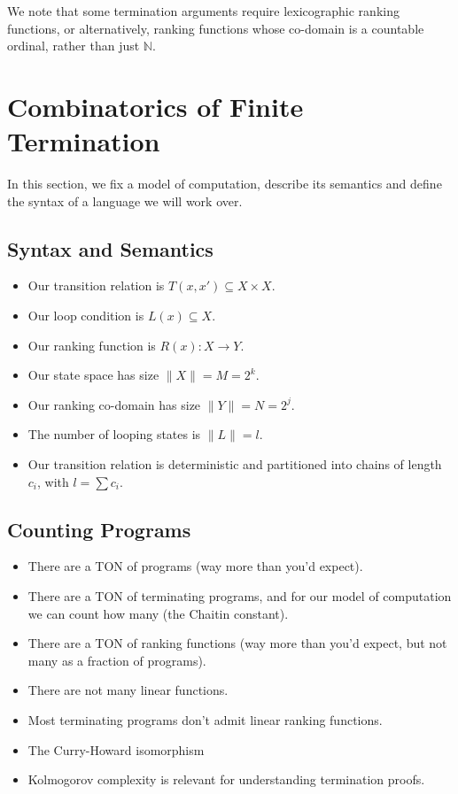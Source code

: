 \documentclass[a4paper]{llncs}
\begin{document}
We note that some termination arguments require lexicographic ranking functions, or
alternatively, ranking functions whose co-domain is a countable ordinal, rather than just $\mathbb{N}$.

\iffalse

\section{Combinatorics of Finite Termination}
In this section, we fix a model of computation, describe its semantics and
define the syntax of a language we will work over.

\subsection{Syntax and Semantics}

\begin{itemize}
 \item Our transition relation is $T(x, x') \subseteq X \times X$.
 \item Our loop condition is $L(x) \subseteq X$.
 \item Our ranking function is $R(x) : X \to Y$.
 \item Our state space has size $\| X \| = M = 2^k$.
 \item Our ranking co-domain has size $\| Y \| = N = 2^j$.
 \item The number of looping states is $\| L \| = l$.
 \item Our transition relation is deterministic and partitioned into chains of length $c_i$, with $l = \sum c_i$.
\end{itemize}

\subsection{Counting Programs}
\begin{itemize}
 \item There are a TON of programs (way more than you'd expect).
 \item There are a TON of terminating programs, and for our model of computation we can count
  how many (the Chaitin constant).
 \item There are a TON of ranking functions (way more than you'd expect, but not many as a
  fraction of programs).
 \item There are not many linear functions.
 \item Most terminating programs don't admit linear ranking functions.
 \item The Curry-Howard isomorphism
 \item Kolmogorov complexity is relevant for understanding termination proofs.
\end{itemize}
\end{document}
